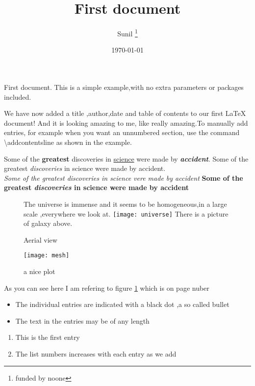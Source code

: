 \documentclass[14pt, letterpaper]{book}
\title{First document}
\author{Sunil \thanks{funded by noone}}
\date{\today}
\begin{document}
First document. This is a simple example,with no extra parameters or packages included.
\maketitle
\tableofcontents
We have now added a title ,author,date and table of contents to our first \LaTeX{} document! And it is looking amazing to me, like really amazing.To manually add entries, for example when you want an unnumbered section, use the command \textbackslash addcontentsline as shown in the example. 

Some of the \textbf{greatest} discoveries in \underline{science} were made by \textbf{\textit{accident}}.
Some of the greatest \emph{discoveries} in science were made by accident.\\ %
\textit{Some of the greatest \emph{discoveries} in science vere made by accident}
\textbf{Some of the greatest \emph{discoveries} in science were made by accident}

\begin{figure}[h]
  \centering
  The universe is immense and it seems to be homogeneous,in a large scale ,everywhere we look at.
  \texttt{[image: universe]}
  There is a picture of galaxy above.
  \caption{Aerial view}
\end{figure}

\begin{figure}[h]
  \centering
  \texttt{[image: mesh]}
  \caption{a nice plot}
  \label{fig:mesh1}
\end{figure}

As you can see here I am refering to figure \ref{fig:mesh1} which is on page nuber \pageref{fig:mesh1}

\begin{itemize}
\item The individual entries are indicated with a black dot ,a so called bullet
\item The text in the entries may be of any length
\end{itemize}

\begin{enumerate}
\item This is the first entry
\item The list numbers increases with each entry as we add
\end{enumerate}
\end{document}
